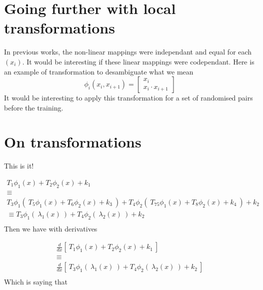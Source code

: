 \documentclass[11pt]{article}
\begin{document}
\section{Going further with local transformations}
In previous works, the non-linear mappings were independant and equal for each $(x_i)$. It would be interesting if these linear mappings were codependant. Here is an example of transformation to desambiguate what we mean
\begin{equation*}
    \phi_i(x_{i}, x_{i+1}) = \begin{bmatrix}
                                x_{i} \\
                                x_{i} \cdot x_{i+1}
                            \end{bmatrix}
\end{equation*}
It would be interesting to apply this transformation for a set of randomised pairs before the training.

\section{On transformations}
This is it!

\begin{gather*}
T_{1} \phi _{1}( x) +T_{2} \phi _{2}( x) +k_{1}\\
\equiv \\
T_{3} \phi _{1}( \ T_{5} \phi _{1}( x) +T_{6} \phi _{2}( x) +k_{3} \ ) +T_{4} \phi _{2}( \ T_{75} \phi _{1}( x) +T_{8} \phi _{2}( x) +k_{4} \ ) +k_{2}\\
\equiv T_{3} \phi _{1}( \ \lambda _{1}( x) \ ) +T_{4} \phi _{2}( \ \lambda _{2}( x) \ ) +k_{2}\\
\end{gather*}
Then we have with derivatives

\begin{gather*}
\frac{d}{dx}[ \ T_{1} \phi _{1}( x) +T_{2} \phi _{2}( x) +k_{1} \ ]\\
\equiv \\
\frac{d}{dx}[ \ T_{3} \phi _{1}( \ \lambda _{1}( x) \ ) +T_{4} \phi _{2}( \ \lambda _{2}( x) \ ) +k_{2} \ ]\\
\end{gather*}
Which is saying that
\end{document}
